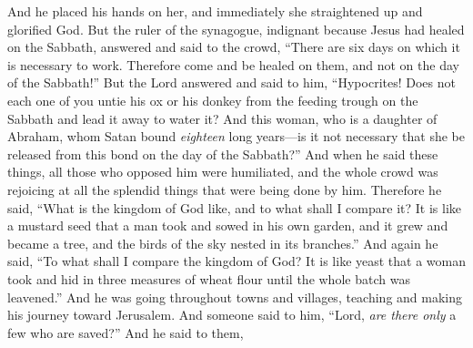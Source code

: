 \begin{biblechapter}
\verse And he placed his hands on her, and immediately she straightened up and glorified God.
\verse But the ruler of the synagogue, indignant because Jesus had healed on the Sabbath, answered and said to the crowd, “There are six days on which it is necessary to work. Therefore come and be healed on them, and not on the day of the Sabbath!”
\verse But the Lord answered and said to him, “Hypocrites! Does not each one of you untie his ox or his donkey from the feeding trough on the Sabbath and lead it away to water it?
\verse And this woman, who is a daughter of Abraham, whom Satan bound \textit{eighteen} long years—is it not necessary that she be released from this bond on the day of the Sabbath?”
\verse And when he said these things, all those who opposed him were humiliated, and the whole crowd was rejoicing at all the splendid things that were being done by him.
 Therefore he said, “What is the kingdom of God like, and to what shall I compare it?
\verse It is like a mustard seed that a man took and sowed in his own garden, and it grew and became a tree, and the birds of the sky nested in its branches.”
 And again he said, “To what shall I compare the kingdom of God?
\verse It is like yeast that a woman took and hid in three measures of wheat flour until the whole batch was leavened.”
 And he was going throughout towns and villages, teaching and making his journey toward Jerusalem.
\verse And someone said to him, “Lord, \textit{are there only} a few who are saved?” And he said to them,

\end{biblechapter}
